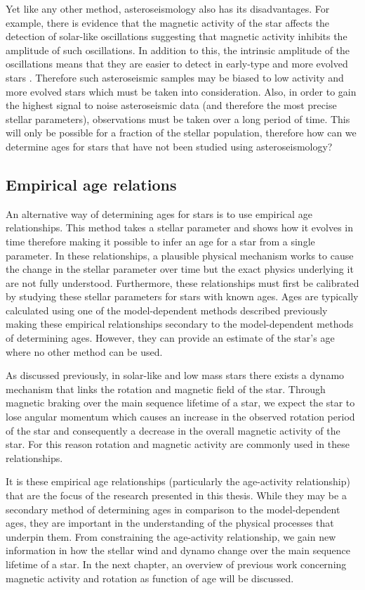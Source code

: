 Yet like any other method, asteroseismology also has its disadvantages. For example, there is evidence that the magnetic activity of the star affects the detection of solar-like oscillations \citep{Chaplin_etal_2011_stellar_activity} suggesting that magnetic activity inhibits the amplitude of such oscillations. In addition to this, the intrinsic amplitude of the oscillations means that they are easier to detect in early-type and more evolved stars \citep{Houdek_etal_1999}. Therefore such asteroseismic samples may be biased to low activity and more evolved stars which must be taken into consideration. Also, in order to gain the highest signal to noise asteroseismic data (and therefore the most precise stellar parameters), observations must be taken over a long period of time. This will only be possible for a fraction of the stellar population, therefore how can we determine ages for stars that have not been studied using asteroseismology?

\subsection{Empirical age relations}
An alternative way of determining ages for stars is to use empirical age relationships. This method takes a stellar parameter and shows how it evolves in time therefore making it possible to infer an age for a star from a single parameter. In these relationships, a plausible physical mechanism works to cause the change in the stellar parameter over time but the exact physics underlying it are not fully understood. Furthermore, these relationships must first be calibrated by studying these stellar parameters for stars with known ages. Ages are typically calculated using one of the model-dependent methods described previously making these empirical relationships secondary to the model-dependent methods of determining ages. However, they can provide an estimate of the star's age where no other method can be used.

As discussed previously, in solar-like and low mass stars there exists a dynamo mechanism that links the rotation and magnetic field of the star. Through magnetic braking over the main sequence lifetime of a star, we expect the star to lose angular momentum which causes an increase in the observed rotation period of the star and consequently a decrease in the overall magnetic activity of the star. For this reason rotation and magnetic activity are commonly used in these relationships.

It is these empirical age relationships (particularly the age-activity relationship) that are the focus of the research presented in this thesis. While they may be a secondary method of determining ages in comparison to the model-dependent ages, they are important in the understanding of the physical processes that underpin them. From constraining the age-activity relationship, we gain new information in how the stellar wind and dynamo change over the main sequence lifetime of a star. In the next chapter, an overview of previous work concerning magnetic activity and rotation as function of age will be discussed.

